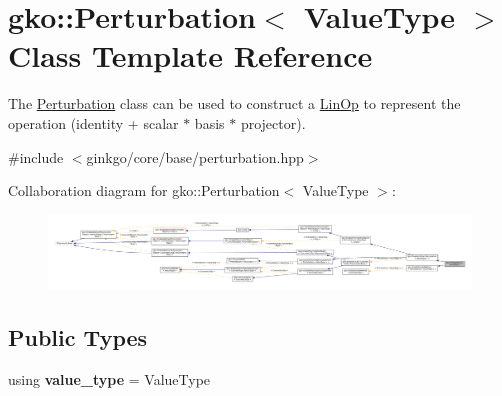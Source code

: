 \hypertarget{classgko_1_1Perturbation}{}\section{gko\+:\+:Perturbation$<$ Value\+Type $>$ Class Template Reference}
\label{classgko_1_1Perturbation}


The \hyperlink{classgko_1_1Perturbation}{Perturbation} class can be used to construct a \hyperlink{classgko_1_1LinOp}{Lin\+Op} to represent the operation {\ttfamily (identity + scalar $\ast$ basis $\ast$ projector)}.  




{\ttfamily \#include $<$ginkgo/core/base/perturbation.\+hpp$>$}



Collaboration diagram for gko\+:\+:Perturbation$<$ Value\+Type $>$\+:
\nopagebreak
\begin{figure}[H]
\begin{center}
\leavevmode
\includegraphics[width=350pt]{classgko_1_1Perturbation__coll__graph}
\end{center}
\end{figure}
\subsection*{Public Types}
\begin{DoxyCompactItemize}
\item 
\mbox{\label{classgko_1_1Perturbation_a4cfdd76ca131540add0bd9d01cee1b5e}} 
using {\bfseries value\+\_\+type} = Value\+Type
\end{DoxyCompactItemize}
